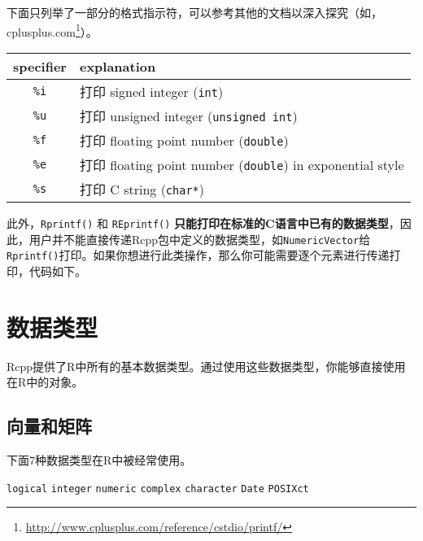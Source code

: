\documentclass[]{ctexbook}
\newenvironment{Shaded}{\begin{snugshade}}{\end{snugshade}}
\newcommand{\DataTypeTok}[1]{\textcolor[rgb]{0.13,0.29,0.53}{#1}}
\newcommand{\DecValTok}[1]{\textcolor[rgb]{0.00,0.00,0.81}{#1}}
\newcommand{\SpecialCharTok}[1]{\textcolor[rgb]{0.00,0.00,0.00}{#1}}
\newcommand{\StringTok}[1]{\textcolor[rgb]{0.31,0.60,0.02}{#1}}
\newcommand{\CommentTok}[1]{\textcolor[rgb]{0.56,0.35,0.01}{\textit{#1}}}
\newcommand{\ControlFlowTok}[1]{\textcolor[rgb]{0.13,0.29,0.53}{\textbf{#1}}}
\newcommand{\NormalTok}[1]{#1}
\renewcommand{\href}[2]{#2\footnote{\url{#1}}}
\begin{document}
下面只列举了一部分的格式指示符，可以参考其他的文档以深入探究（如，\href{http://www.cplusplus.com/reference/cstdio/printf/}{cplusplus.com}）。

\begin{longtable}[]{@{}cl@{}}
\toprule
specifier & explanation\tabularnewline
\midrule
\endhead
\texttt{\%i} & 打印 signed integer (\texttt{int})\tabularnewline
\texttt{\%u} & 打印 unsigned integer
(\texttt{unsigned\ int})\tabularnewline
\texttt{\%f} & 打印 floating point number
(\texttt{double})\tabularnewline
\texttt{\%e} & 打印 floating point number (\texttt{double}) in
exponential style\tabularnewline
\texttt{\%s} & 打印 C string (\texttt{char*})\tabularnewline
\bottomrule
\end{longtable}

此外，\texttt{Rprintf()} 和 \texttt{REprintf()}
\textbf{只能打印在标准的C语言中已有的数据类型}，因此，用户并不能直接传递Rcpp包中定义的数据类型，如\texttt{NumericVector}给\texttt{Rprintf()}打印。如果你想进行此类操作，那么你可能需要逐个元素进行传递打印，代码如下。

\begin{Shaded}
\end{Shaded}

\chapter{数据类型}\label{datatypes}

Rcpp提供了R中所有的基本数据类型。通过使用这些数据类型，你能够直接使用在R中的对象。

\section{向量和矩阵}\label{vectorMatrix}

下面7种数据类型在R中被经常使用。

\texttt{logical} \texttt{integer} \texttt{numeric} \texttt{complex}
\texttt{character} \texttt{Date} \texttt{POSIXct}
\end{document}

